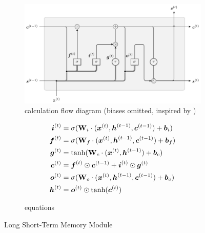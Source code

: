 \begin{figure}[H]
  \centering
  \begin{subfigure}[]{\textwidth}
    \begin{center}
    \includegraphics[]{figs/lstm.pdf}
    \end{center}
    \caption{calculation flow diagram (biases omitted, inspired by \cite{Colah2015})}
    \label{fig:lstm} 
  \end{subfigure}
  \begin{subfigure}[]{\textwidth}
    \begin{subequations}
      \begin{align}
        \boldsymbol{i}\sp{(t)} 
        &= 
          \sigma
          (
          \mathbf{W}_i \cdot
          (
          \boldsymbol{x}\sp{(t)},
          \boldsymbol{h}\sp{(t-1)},
          \boldsymbol{c}\sp{(t-1)}
          )
          +\boldsymbol{b}_i
          ) 
        \\
        \boldsymbol{f}\sp{(t)} 
        &=
          \sigma
          (
          \mathbf{W}_f \cdot
          (
          \boldsymbol{x}\sp{(t)},
          \boldsymbol{h}\sp{(t-1)},
          \boldsymbol{c}\sp{(t-1)}
          )
          +\boldsymbol{b}_f
          )
        \\
        \boldsymbol{g}\sp{(t)}
        &=
          \tanh
          (
          \mathbf{W}_c \cdot
          (
          \boldsymbol{x}\sp{(t)},
          \boldsymbol{h}\sp{(t-1)}
          )
          +\boldsymbol{b}_c
          )
        \\
        \boldsymbol{c}\sp{(t)} 
        &= 
          \boldsymbol{f}\sp{(t)}   \odot \boldsymbol{c}\sp{(t-1)}
          + \boldsymbol{i}\sp{(t)} \odot \boldsymbol{g}\sp{(t)}
        \label{eqn:lstms}\\
        \boldsymbol{o}\sp{(t)}
        &=
          \sigma
          (
          \mathbf{W}_o \cdot
          (
          \boldsymbol{x}\sp{(t)},
          \boldsymbol{h}\sp{(t-1)},
          \boldsymbol{c}\sp{(t-1)}
          )
          +\boldsymbol{b}_o
          )
        \\
        \boldsymbol{h}\sp{(t)}
        &=
          \boldsymbol{o}\sp{(t)} \odot
          \tanh
          (
          \boldsymbol{c}\sp{(t)}
          )
      \end{align}
    \end{subequations}
    \caption{equations}
    \label{eqn:lstm}
  \end{subfigure}
  \caption{Long Short-Term Memory Module}
  \label{fig:lstmfig}
\end{figure}
